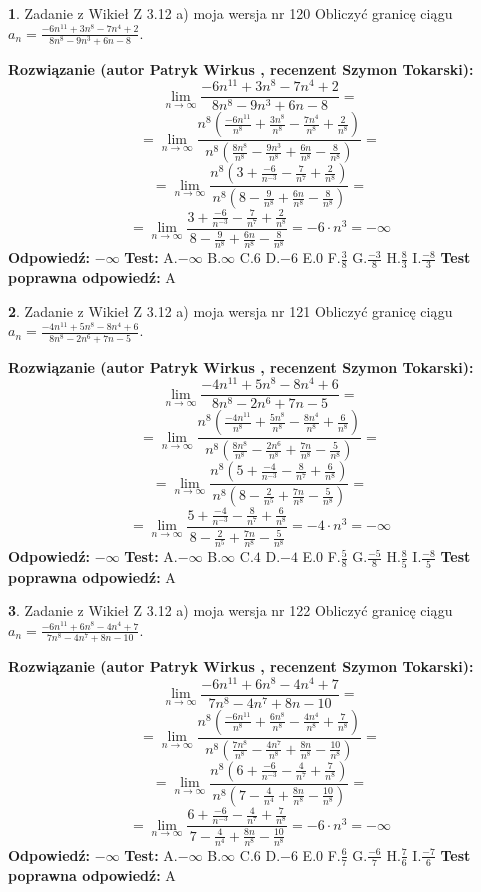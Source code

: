 \documentclass[12pt, a4paper]{article}
\theoremstyle{definition} %
\newtheorem{zad}{}
\newcommand{\zadStart}[1]{\begin{zad}#1\newline}
\newcommand{\zadStop}{\end{zad}}
\newcommand{\rozwStart}[2]{\noindent \textbf{Rozwiązanie (autor #1 , recenzent #2): }\newline}
\newcommand{\rozwStop}{\newline}
\newcommand{\odpStart}{\noindent \textbf{Odpowiedź:}\newline}
\newcommand{\odpStop}{\newline}
\newcommand{\testStart}{\noindent \textbf{Test:}\newline}
\newcommand{\testStop}{\newline}
\newcommand{\kluczStart}{\noindent \textbf{Test poprawna odpowiedź:}\newline}
\newcommand{\kluczStop}{\newline}
\begin{document}
\zadStart{Zadanie z Wikieł Z 3.12 a) moja wersja nr 120}
Obliczyć granicę ciągu $a_{n}=\frac{-6n^{11}+3n^{8}-7n^{4}+2}{8n^{8}-9n^{3}+6n-8}$.
\zadStop
\rozwStart{Patryk Wirkus}{Szymon Tokarski}
$$\lim\limits_{n\to\infty}\frac{-6n^{11}+3n^{8}-7n^{4}+2}{8n^{8}-9n^{3}+6n-8}=$$
$$=\lim\limits_{n\to\infty}\frac{n^{8}\left(\frac{-6n^{11}}{n^{8}}+\frac{3n^{8}}{n^{8}}-\frac{7n^{4}}{n^{8}}+\frac{2}{n^{8}}\right)}{n^{8}\left(\frac{8n^{8}}{n^{8}}-\frac{9n^{3}}{n^{8}}+\frac{6n}{n^{8}}-\frac{8}{n^{8}}\right)}=$$
$$=\lim\limits_{n\to\infty}\frac{n^{8}\left(3+\frac{-6}{n^{-3}}-\frac{7}{n^{7}}+\frac{2}{n^{8}}\right)}
{n^{8}\left(8-\frac{9}{n^{8}}+\frac{6n}{n^{8}}-\frac{8}{n^{8}}\right)}=$$
$$=\lim\limits_{n\to\infty}\frac{3+\frac{-6}{n^{-3}}-\frac{7}{n^{7}}+\frac{2}{n^{8}}}{8-\frac{9}{n^{8}}+\frac{6n}{n^{8}}-\frac{8}{n^{8}}}=-6\cdot n^{3} = -\infty$$
\rozwStop
\odpStart
$-\infty$
\odpStop
\testStart
A.$-\infty$
B.$\infty$
C.$6$
D.$-6$
E.$0$
F.$\frac{3}{8}$
G.$\frac{-3}{8}$
H.$\frac{8}{3}$
I.$\frac{-8}{3}$
\testStop
\kluczStart
A
\kluczStop



\zadStart{Zadanie z Wikieł Z 3.12 a) moja wersja nr 121}
Obliczyć granicę ciągu $a_{n}=\frac{-4n^{11}+5n^{8}-8n^{4}+6}{8n^{8}-2n^{6}+7n-5}$.
\zadStop
\rozwStart{Patryk Wirkus}{Szymon Tokarski}
$$\lim\limits_{n\to\infty}\frac{-4n^{11}+5n^{8}-8n^{4}+6}{8n^{8}-2n^{6}+7n-5}=$$
$$=\lim\limits_{n\to\infty}\frac{n^{8}\left(\frac{-4n^{11}}{n^{8}}+\frac{5n^{8}}{n^{8}}-\frac{8n^{4}}{n^{8}}+\frac{6}{n^{8}}\right)}{n^{8}\left(\frac{8n^{8}}{n^{8}}-\frac{2n^{6}}{n^{8}}+\frac{7n}{n^{8}}-\frac{5}{n^{8}}\right)}=$$
$$=\lim\limits_{n\to\infty}\frac{n^{8}\left(5+\frac{-4}{n^{-3}}-\frac{8}{n^{7}}+\frac{6}{n^{8}}\right)}
{n^{8}\left(8-\frac{2}{n^{5}}+\frac{7n}{n^{8}}-\frac{5}{n^{8}}\right)}=$$
$$=\lim\limits_{n\to\infty}\frac{5+\frac{-4}{n^{-3}}-\frac{8}{n^{7}}+\frac{6}{n^{8}}}{8-\frac{2}{n^{5}}+\frac{7n}{n^{8}}-\frac{5}{n^{8}}}=-4\cdot n^{3} = -\infty$$
\rozwStop
\odpStart
$-\infty$
\odpStop
\testStart
A.$-\infty$
B.$\infty$
C.$4$
D.$-4$
E.$0$
F.$\frac{5}{8}$
G.$\frac{-5}{8}$
H.$\frac{8}{5}$
I.$\frac{-8}{5}$
\testStop
\kluczStart
A
\kluczStop



\zadStart{Zadanie z Wikieł Z 3.12 a) moja wersja nr 122}
Obliczyć granicę ciągu $a_{n}=\frac{-6n^{11}+6n^{8}-4n^{4}+7}{7n^{8}-4n^{7}+8n-10}$.
\zadStop
\rozwStart{Patryk Wirkus}{Szymon Tokarski}
$$\lim\limits_{n\to\infty}\frac{-6n^{11}+6n^{8}-4n^{4}+7}{7n^{8}-4n^{7}+8n-10}=$$
$$=\lim\limits_{n\to\infty}\frac{n^{8}\left(\frac{-6n^{11}}{n^{8}}+\frac{6n^{8}}{n^{8}}-\frac{4n^{4}}{n^{8}}+\frac{7}{n^{8}}\right)}{n^{8}\left(\frac{7n^{8}}{n^{8}}-\frac{4n^{7}}{n^{8}}+\frac{8n}{n^{8}}-\frac{10}{n^{8}}\right)}=$$
$$=\lim\limits_{n\to\infty}\frac{n^{8}\left(6+\frac{-6}{n^{-3}}-\frac{4}{n^{7}}+\frac{7}{n^{8}}\right)}
{n^{8}\left(7-\frac{4}{n^{4}}+\frac{8n}{n^{8}}-\frac{10}{n^{8}}\right)}=$$
$$=\lim\limits_{n\to\infty}\frac{6+\frac{-6}{n^{-3}}-\frac{4}{n^{7}}+\frac{7}{n^{8}}}{7-\frac{4}{n^{4}}+\frac{8n}{n^{8}}-\frac{10}{n^{8}}}=-6\cdot n^{3} = -\infty$$
\rozwStop
\odpStart
$-\infty$
\odpStop
\testStart
A.$-\infty$
B.$\infty$
C.$6$
D.$-6$
E.$0$
F.$\frac{6}{7}$
G.$\frac{-6}{7}$
H.$\frac{7}{6}$
I.$\frac{-7}{6}$
\testStop
\kluczStart
A
\kluczStop
\end{document}

